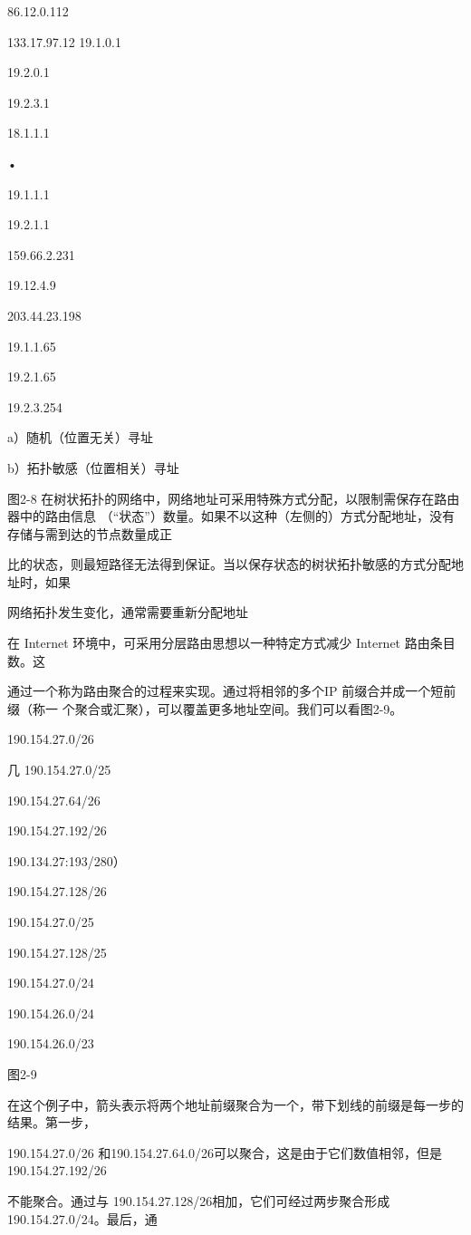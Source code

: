 86.12.0.112

133.17.97.12 19.1.0.1

19.2.0.1

19.2.3.1

18.1.1.1

•

19.1.1.1

19.2.1.1

159.66.2.231

19.12.4.9

203.44.23.198

19.1.1.65

19.2.1.65

19.2.3.254

a）随机（位置无关）寻址

b）拓扑敏感（位置相关）寻址

图2-8 在树状拓扑的网络中，网络地址可采用特殊方式分配，以限制需保存在路由器中的路由信息
（“状态”）数量。如果不以这种（左侧的）方式分配地址，没有存储与需到达的节点数量成正

比的状态，则最短路径无法得到保证。当以保存状态的树状拓扑敏感的方式分配地址时，如果

网络拓扑发生变化，通常需要重新分配地址

在 Internet 环境中，可采用分层路由思想以一种特定方式减少 Internet 路由条目数。这

通过一个称为路由聚合的过程来实现。通过将相邻的多个IP 前缀合并成一个短前缀（称一
个聚合或汇聚），可以覆盖更多地址空间。我们可以看图2-9。

190.154.27.0/26

几 190.154.27.0/25

190.154.27.64/26

190.154.27.192/26

190.134.27:193/280）

190.154.27.128/26

190.154.27.0/25

190.154.27.128/25

190.154.27.0/24

190.154.26.0/24

190.154.26.0/23

图2-9

在这个例子中，箭头表示将两个地址前缀聚合为一个，带下划线的前缀是每一步的结果。第一步，

190.154.27.0/26 和190.154.27.64.0/26可以聚合，这是由于它们数值相邻，但是190.154.27.192/26

不能聚合。通过与 190.154.27.128/26相加，它们可经过两步聚合形成 190.154.27.0/24。最后，通

